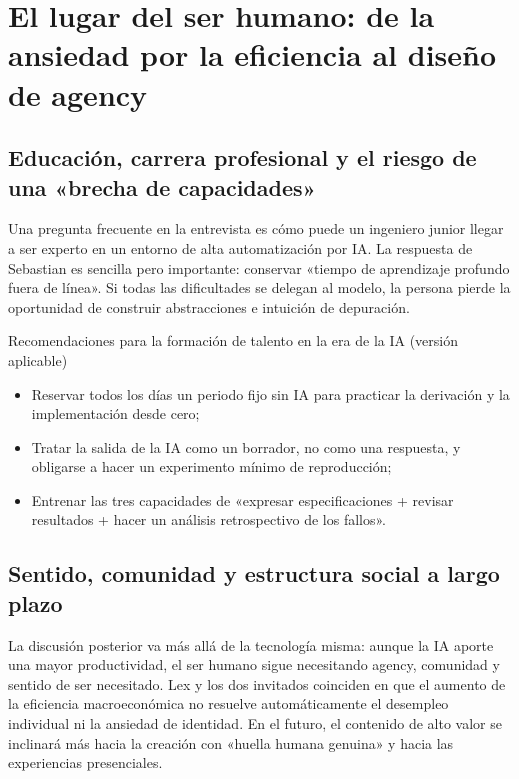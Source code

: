 \section{El lugar del ser humano: de la ansiedad por la eficiencia al diseño de agency}

\subsection{Educación, carrera profesional y el riesgo de una «brecha de capacidades»}

Una pregunta frecuente en la entrevista es cómo puede un ingeniero junior llegar a ser experto en un entorno de alta automatización por IA. La respuesta de Sebastian es sencilla pero importante: conservar «tiempo de aprendizaje profundo fuera de línea». Si todas las dificultades se delegan al modelo, la persona pierde la oportunidad de construir abstracciones e intuición de depuración.

\begin{importantbox}{Recomendaciones para la formación de talento en la era de la IA (versión aplicable)}
\begin{itemize}[leftmargin=1.5em]
    \item Reservar todos los días un periodo fijo sin IA para practicar la derivación y la implementación desde cero;
    \item Tratar la salida de la IA como un borrador, no como una respuesta, y obligarse a hacer un experimento mínimo de reproducción;
    \item Entrenar las tres capacidades de «expresar especificaciones + revisar resultados + hacer un análisis retrospectivo de los fallos».
\end{itemize}
\end{importantbox}

\subsection{Sentido, comunidad y estructura social a largo plazo}

La discusión posterior va más allá de la tecnología misma: aunque la IA aporte una mayor productividad, el ser humano sigue necesitando agency, comunidad y sentido de ser necesitado. Lex y los dos invitados coinciden en que el aumento de la eficiencia macroeconómica no resuelve automáticamente el desempleo individual ni la ansiedad de identidad. En el futuro, el contenido de alto valor se inclinará más hacia la creación con «huella humana genuina» y hacia las experiencias presenciales.

